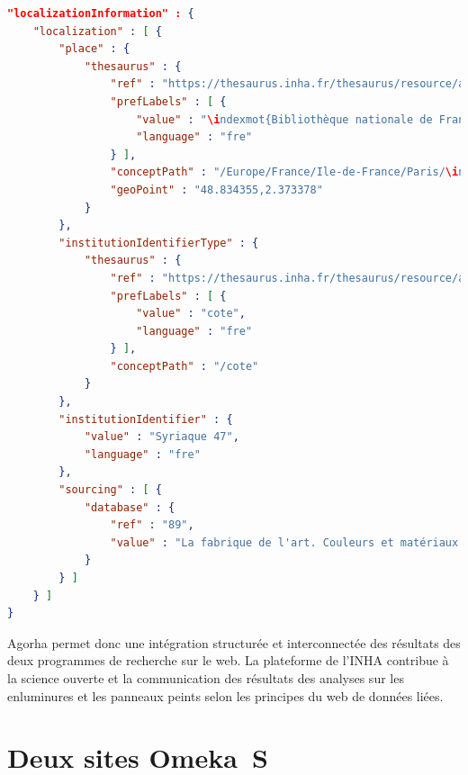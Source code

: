 \begin{lstlisting}[language=json]
"localizationInformation" : {
	"localization" : [ {
		"place" : {
			"thesaurus" : {
				"ref" : "https://thesaurus.inha.fr/thesaurus/resource/ark:/54721/bd1b5af3-9b44-49e9-98b8-b97ca10dd7f2",
				"prefLabels" : [ {
					"value" : "\indexmot{Bibliothèque nationale de France} (Paris)",
					"language" : "fre"
				} ],
				"conceptPath" : "/Europe/France/Ile-de-France/Paris/\indexmot{Bibliothèque nationale de France} (Paris)",
				"geoPoint" : "48.834355,2.373378"
			}
		},
		"institutionIdentifierType" : {
			"thesaurus" : {
				"ref" : "https://thesaurus.inha.fr/thesaurus/resource/ark:/54721/feccfc54-f2da-458a-a42c-530037a5132b",
				"prefLabels" : [ {
					"value" : "cote",
					"language" : "fre"
				} ],
				"conceptPath" : "/cote"
			}
		},
		"institutionIdentifier" : {
			"value" : "Syriaque 47",
			"language" : "fre"
		},
		"sourcing" : [ {
			"database" : {
				"ref" : "89",
				"value" : "La fabrique de l'art. Couleurs et matériaux de l'enluminure"
			}
		} ]
	} ]
}
\end{lstlisting} \par
Agorha permet donc une intégration structurée et interconnectée des résultats des deux programmes de recherche sur le web. La plateforme de l’INHA contribue à la science ouverte et la communication des résultats des analyses sur les enluminures et les panneaux peints selon les principes du web de données liées. \newpage

\section{Deux sites Omeka~S}

